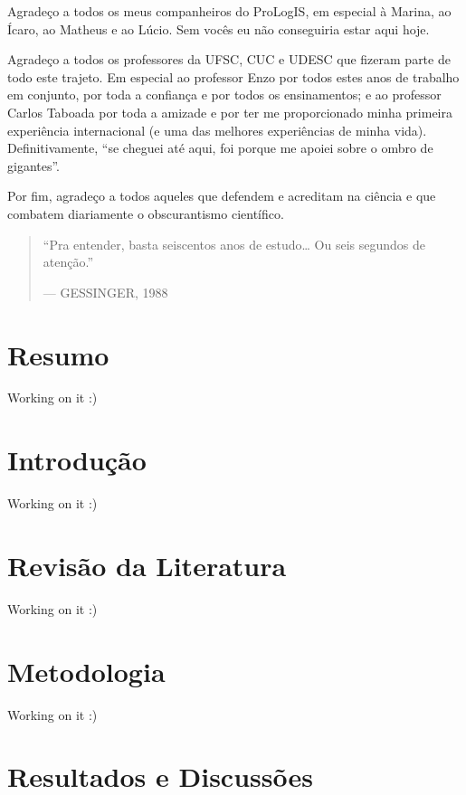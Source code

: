 \documentclass[
]{book}
\begin{document}
Agradeço a todos os meus companheiros do ProLogIS, em especial à Marina, ao Ícaro, ao Matheus e ao Lúcio. Sem vocês eu não conseguiria estar aqui hoje.

Agradeço a todos os professores da UFSC, CUC e UDESC que fizeram parte de todo este trajeto. Em especial ao professor Enzo por todos estes anos de trabalho em conjunto, por toda a confiança e por todos os ensinamentos; e ao professor Carlos Taboada por toda a amizade e por ter me proporcionado minha primeira experiência internacional (e uma das melhores experiências de minha vida). Definitivamente, ``se cheguei até aqui, foi porque me apoiei sobre o ombro de gigantes''.

Por fim, agradeço a todos aqueles que defendem e acreditam na ciência e que combatem diariamente o obscurantismo científico.

\begin{quote}
``Pra entender, basta seiscentos anos de estudo\ldots{} Ou seis segundos de atenção.''

\hfill --- GESSINGER, 1988
\end{quote}

\hypertarget{resumo}{%
\chapter*{Resumo}\label{resumo}}

Working on it :)

\hypertarget{introduuxe7uxe3o}{%
\chapter{Introdução}\label{introduuxe7uxe3o}}

Working on it :)

\hypertarget{revisuxe3o-da-literatura}{%
\chapter{Revisão da Literatura}\label{revisuxe3o-da-literatura}}

Working on it :)

\hypertarget{metodologia}{%
\chapter{Metodologia}\label{metodologia}}

Working on it :)

\hypertarget{resultados-e-discussuxf5es}{%
\chapter{Resultados e Discussões}\label{resultados-e-discussuxf5es}}
\end{document}
